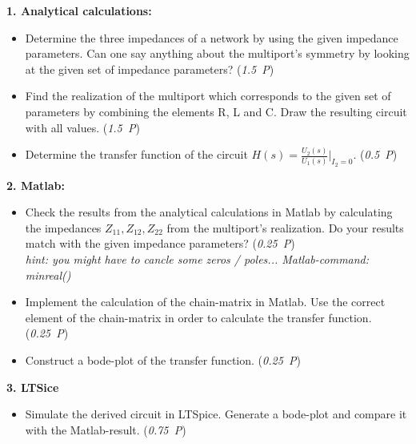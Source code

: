 \documentclass[a4paper]{article}
\begin{document}
\textbf{1. Analytical calculations:}

\begin{itemize}
	\item Determine the three impedances of a network by using the given impedance parameters. Can one say anything about the multiport's symmetry by looking at the given set of impedance parameters? (\textit{1.5~P})
	\item Find the realization of the multiport which corresponds to the given set of parameters by combining the elements R, L and C. Draw the resulting circuit with all values. (\textit{1.5~P})
	\item Determine the transfer function of the circuit $H(s) = \frac{U_2(s)}{U_1(s)}\Big|_{I_2 = 0}$. (\textit{0.5~P})
\end{itemize}

\textbf{2. Matlab:}

\begin{itemize}
	\item Check the results from the analytical calculations in Matlab by calculating the impedances $Z_{11},Z_{12},Z_{22}$ from the multiport's realization. Do your results match with the given impedance parameters? (\textit{0.25~P}) \\
	\textit{hint: you might have to cancle some zeros / poles... Matlab-command: minreal()}
	\item Implement the calculation of the chain-matrix in Matlab. Use the correct element of the chain-matrix in order to calculate the transfer function. (\textit{0.25~P})
	\item Construct a bode-plot of the transfer function. (\textit{0.25~P})

\end{itemize}

\textbf{3. LTSice}

\begin{itemize}
	\item Simulate the derived circuit in LTSpice. Generate a bode-plot and compare it with the Matlab-result. (\textit{0.75~P})
\end{itemize}
\end{document}
